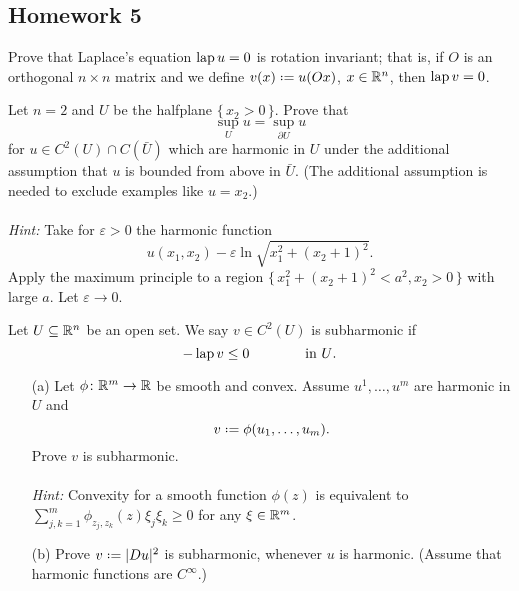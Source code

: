 \subsection{Homework 5}
\begin{problem}
  Prove that Laplace's equation \(\operatorname{lap} u=0\) is rotation invariant; that
  is, if \(O\) is an orthogonal \(n\times n\) matrix and we define
  \(v(x)\defeq u(Ox)\), \(x\in\mathbb{R}^n\), then \(\operatorname{lap} v=0\).
\end{problem}
\begin{solution*}
\end{solution*}

\begin{problem}
  Let \(n=2\) and \(U\) be the halfplane \(\{\,x_2>0\,\}\). Prove that
  \[
    \sup_U u=\sup_{\partial U}u
  \]
  for \(u\in C^2(U)\cap C(\bar U)\) which are harmonic in \(U\) under the
  additional assumption that \(u\) is bounded from above in \(\bar
  U\). (The additional assumption is needed to exclude examples like
  \(u=x_2\).)
  \\\\
  \emph{Hint:} Take for \(\varepsilon>0\) the harmonic function
  \[
    u(x_1,x_2)-\varepsilon\ln\sqrt{x_1^2+(x_2+1)^2}.
  \]
  Apply the maximum principle to a region
  \(\bigl\{\,x_1^2+(x_2+1)^2<a^2,x_2>0\,\bigr\}\) with large \(a\). Let
  \(\varepsilon\to 0\).
\end{problem}
\begin{solution*}
\end{solution*}

\begin{problem}
  Let \(U\subseteq\mathbb{R}^n\) be an open set. We say \(v \in C^2(U)\) is
  subharmonic if
  \[
    -\operatorname{lap} v\leq 0\qquad\qquad\text{in \(U\).}
  \]
  \begin{itemize}
  \item[(a)] Let \(\phi\colon\bbR^m\to\bbR\) be smooth and
    convex. Assume \(u^1,\dotsc,u^m\) are harmonic in \(U\) and
    \[
      v\defeq\phi(u_1,\dotsc,u_m).
    \]
    Prove \(v\) is subharmonic.
    \\\\
    \emph{Hint:} Convexity for a smooth function \(\phi(z)\) is
    equivalent to \(\sum_{j,k=1}^m\phi_{z_j,z_k}(z)\xi_j\xi_k\geq 0\)
    for any \(\xi\in\mathbb{R}^m\).
  \item[(b)] Prove \(v\defeq|Du|^2\) is subharmonic, whenever \(u\) is
    harmonic. (Assume that harmonic functions are \(C^\infty\).)
  \end{itemize}
\end{problem}
\begin{solution*}
\end{solution*}

